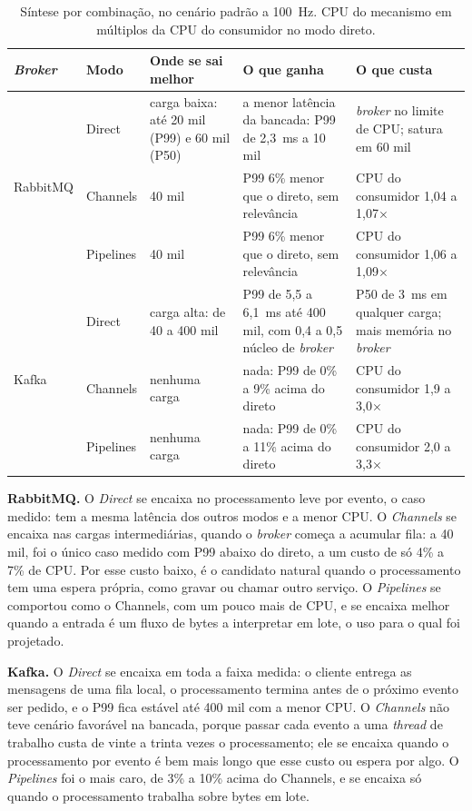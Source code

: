 \documentclass[12pt]{article}
\begin{document}
\begin{table}[ht]
\centering
\caption{Síntese por combinação, no cenário padrão a 100~Hz. CPU do mecanismo em
múltiplos da CPU do consumidor no modo direto.}
\label{tab:sintese}
\small
\begin{tabular}{|l|l|p{3.0cm}|p{4.1cm}|p{3.7cm}|}
\hline
\textbf{\textit{Broker}} & \textbf{Modo} & \textbf{Onde se sai melhor} & \textbf{O que ganha} & \textbf{O que custa} \\
\hline
\multirow{3}{*}{RabbitMQ} & Direct & carga baixa: até 20 mil (P99) e 60 mil (P50) & a menor latência da bancada: P99 de 2,3~ms a 10 mil & \textit{broker} no limite de CPU; satura em 60 mil \\
\cline{2-5}
 & Channels & 40 mil & P99 6\% menor que o direto, sem relevância & CPU do consumidor 1,04 a 1,07$\times$ \\
\cline{2-5}
 & Pipelines & 40 mil & P99 6\% menor que o direto, sem relevância & CPU do consumidor 1,06 a 1,09$\times$ \\
\hline
\multirow{3}{*}{Kafka} & Direct & carga alta: de 40 a 400 mil & P99 de 5,5 a 6,1~ms até 400 mil, com 0,4 a 0,5 núcleo de \textit{broker} & P50 de 3~ms em qualquer carga; mais memória no \textit{broker} \\
\cline{2-5}
 & Channels & nenhuma carga & nada: P99 de 0\% a 9\% acima do direto & CPU do consumidor 1,9 a 3,0$\times$ \\
\cline{2-5}
 & Pipelines & nenhuma carga & nada: P99 de 0\% a 11\% acima do direto & CPU do consumidor 2,0 a 3,3$\times$ \\
\hline
\end{tabular}
\end{table}

\textbf{RabbitMQ.} O \textit{Direct} se encaixa no processamento leve por evento, o caso
medido: tem a mesma latência dos outros modos e a menor CPU. O \textit{Channels} se
encaixa nas cargas intermediárias, quando o \textit{broker} começa a acumular fila: a 40 mil, foi o
único caso medido com P99 abaixo do direto, a um custo de só 4\% a 7\% de CPU. Por esse
custo baixo, é o candidato natural quando o processamento tem uma espera própria, como
gravar ou chamar outro serviço. O \textit{Pipelines} se comportou como o Channels, com um
pouco mais de CPU, e se encaixa melhor quando a entrada é um fluxo de bytes a interpretar
em lote, o uso para o qual foi projetado.

\textbf{Kafka.} O \textit{Direct} se encaixa em toda a faixa medida: o cliente entrega as
mensagens de uma fila local, o processamento termina antes de o próximo evento ser pedido,
e o P99 fica estável até 400 mil com a menor CPU. O \textit{Channels} não teve cenário
favorável na bancada, porque passar cada evento a uma \textit{thread} de trabalho custa de vinte a
trinta vezes o processamento; ele se encaixa quando o processamento por evento é bem mais
longo que esse custo ou espera por algo. O \textit{Pipelines} foi o mais caro, de 3\% a
10\% acima do Channels, e se encaixa só quando o processamento trabalha sobre bytes em
lote.
\end{document}
